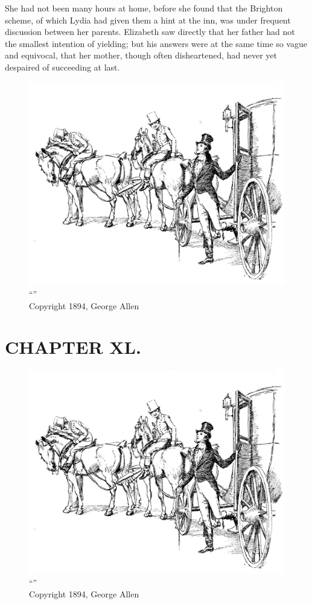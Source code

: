 She had not been many hours at home, before she found that the Brighton scheme, of which Lydia had given them a hint at the inn, was under frequent discussion between her parents. Elizabeth saw directly that her father had not the smallest intention of yielding; but his answers were at the same time so vague and equivocal, that her mother, though often disheartened, had never yet despaired of succeeding at last.

\begin{figure}[htbp]
    \centering
    \includegraphics[width=\textwidth]{illustrations/i_031.jpg}
    \caption{“”\\ Copyright 1894, George Allen}
    \label{fig:image}
\end{figure}


\chapter{CHAPTER XL.}

\begin{figure}[htbp]
    \centering
    \includegraphics[width=\textwidth]{illustrations/i_031.jpg}
    \caption{“”\\ Copyright 1894, George Allen}
    \label{fig:image}
\end{figure}


